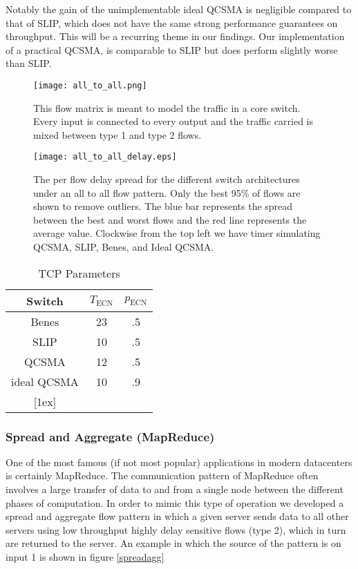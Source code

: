 \documentclass{IEEEtran}%
\begin{document}
Notably the gain of the unimplementable ideal QCSMA is negligible compared to that of SLIP, which does not have the same strong performance guarantees on throughput.  This will be a recurring theme in our findings.  Our implementation of a practical QCSMA, is comparable to SLIP but does perform slightly worse than SLIP.

\begin{figure}%
	 \texttt{[image: all\_to\_all.png]}
	\caption{This flow matrix is meant to model the traffic in a core switch.  Every input is connected to every output and the traffic carried is mixed between type 1 and type 2 flows.}
	\label{all_to_all}
\end{figure}

\begin{figure}%
	 \texttt{[image: all\_to\_all\_delay.eps]}
	\caption{The per flow delay spread for the different switch architectures under an all to all flow pattern.  Only the best 95\% of flows are shown to remove outliers.  The blue bar represents the spread between the best and worst flows and the red line represents the average value.  Clockwise from the top left we have timer simulating QCSMA, SLIP, Benes, and Ideal QCSMA.}
	\label{all_to_all_delay}
\end{figure}

\begin{table}[ht] \caption{TCP Parameters} 
\centering 
\begin{tabular}{c c c}
 \hline\hline 
 Switch & $T_{\text{ECN}}$ & $p_{\text{ECN}}$ \\
  [0.5ex] \hline 
  Benes&23&.5 \\
 SLIP&10&.5 \\
  QCSMA&12&.5  \\
   ideal  QCSMA&10&.9  \\
  [1ex] \hline 
  \end{tabular}
   \label{ecn_table} 
\end{table}


\subsubsection{Spread and Aggregate (MapReduce)}
One of the most famous (if not most popular) applications in modern datacenters is certainly MapReduce.  The communication pattern of MapReduce often involves a large transfer of data to and from a single node between the different phases of computation.  In order to mimic this type of operation we developed a spread and aggregate flow pattern in which a given server sends data to all other servers using low throughput highly delay sensitive flows (type 2), which in turn are returned to the server.   An example in which the source of the pattern is on input 1 is shown in figure \ref{spreadagg}
\end{document}
